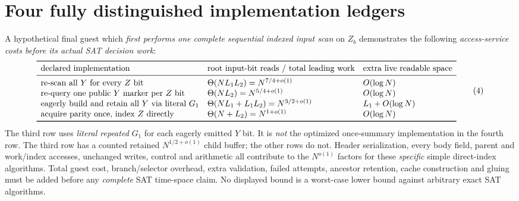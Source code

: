 \documentclass[11pt]{article}
\begin{document}
\section{Four fully distinguished implementation ledgers}
A hypothetical final guest which \emph{first
performs one complete sequential indexed input
scan} on \(Z_b\) demonstrates the following
\emph{access-service costs before its actual SAT
decision work}:
\[
\begin{array}{lll}
\toprule
\text{declared implementation}&
\text{root input-bit reads / total leading work}&
\text{extra live readable space}\\
\midrule
\text{re-scan all }Y\text{ for every }Z\text{ bit}
 &\Theta(NL_1L_2)=N^{7/4+o(1)}
 &O(\log N)\\
\text{re-query one public }Y\text{ marker per }Z\text{ bit}
 &\Theta(NL_2)=N^{5/4+o(1)}
 &O(\log N)\\
\text{eagerly build and retain all }Y\text{ via literal }G_1
 &\Theta(NL_1+L_1L_2)=N^{3/2+o(1)}
 &L_1+O(\log N)\\
\text{acquire parity once, index }Z\text{ directly}
 &\Theta(N+L_2)=N^{1+o(1)}
 &O(\log N)\\
\bottomrule
\end{array}\tag{4}
\]
The third row uses \emph{literal repeated}
\(G_1\) for each eagerly emitted \(Y\) bit.
It is \emph{not} the optimized once-summary
implementation in the fourth row. The third
row has a counted retained \(N^{1/2+o(1)}\)
child buffer; the other rows do not. Header
serialization, every body field, parent and
work/index accesses, unchanged writes,
control and arithmetic all contribute to the
\(N^{o(1)}\) factors for these \emph{specific}
simple direct-index algorithms. Total guest
cost, branch/selector overhead, extra validation,
failed attempts, ancestor retention, cache
construction and gluing must be added before
any \emph{complete} SAT time-space claim.
No displayed bound is a worst-case lower bound
against arbitrary exact SAT algorithms.
\end{document}

